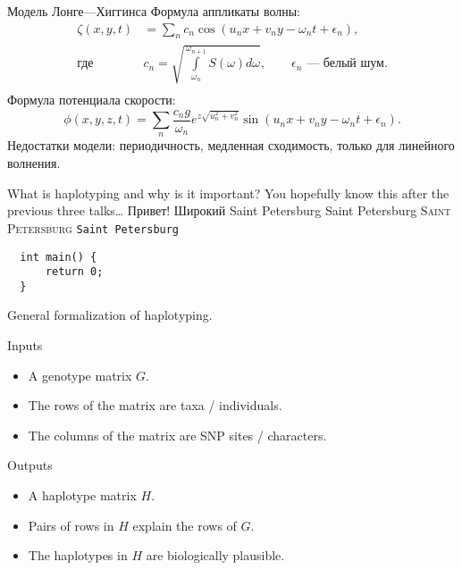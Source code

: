 \documentclass[aspectratio=169]{beamer}
\begin{document}
\begin{frame}{Модель Лонге---Хиггинса}
    \small
    Формула аппликаты волны:
    \begin{equation*}
        \begin{array}{ll}
            \zeta(x,y,t) &= \sum\limits_n c_n \cos(u_n x + v_n y - \omega_n t + \epsilon_n), \\
            \text{где} & {\textstyle c_n = \sqrt{ \int\limits_{\omega_n}^{\omega_{n+1}} S(\omega) d\omega}},
            \qquad\epsilon_n\text{ --- белый шум}.\\
        \end{array}
    \end{equation*}
    Формула потенциала скорости:
    \begin{equation*}
        \phi(x,y,z,t) = \sum_n \frac{c_n g}{\omega_n} 
        e^{z\sqrt{u_n^2+v_n^2}}
        \sin(u_n x + v_n y - \omega_n t + \epsilon_n).
    \end{equation*}
    Недостатки модели: периодичность, медленная сходимость, только для линейного волнения.
\end{frame}


\begin{frame}[fragile]{What is haplotyping and why is it important?}
  You hopefully know this after the previous three talks\dots
  Привет!
  \newline
  \textrm{Широкий}\newline
  \textrm{Saint Petersburg}\newline
  \textsf{Saint Petersburg}\newline
  \textsc{Saint Petersburg}\newline
  \texttt{Saint Petersburg}\newline
  \begin{verbatim}
  int main() {
      return 0;
  }
  \end{verbatim}
\end{frame}

\begin{frame}[t]{General formalization of haplotyping.}
  \begin{block}{Inputs}
    \begin{itemize}
    \item A \alert{genotype matrix} $G$.
    \item The \alert{rows} of the matrix are \alert{taxa / individuals}.
    \item The \alert{columns} of the matrix are \alert{SNP sites /
        characters}. 
    \end{itemize}
  \end{block}
  \begin{block}{Outputs}
    \begin{itemize}
    \item A \alert{haplotype matrix} $H$.
    \item Pairs of rows in $H$ \alert{explain} the rows of $G$.
    \item The haplotypes in $H$ are \alert{biologically plausible}. 
    \end{itemize}
  \end{block}
\end{frame}
\end{document}
